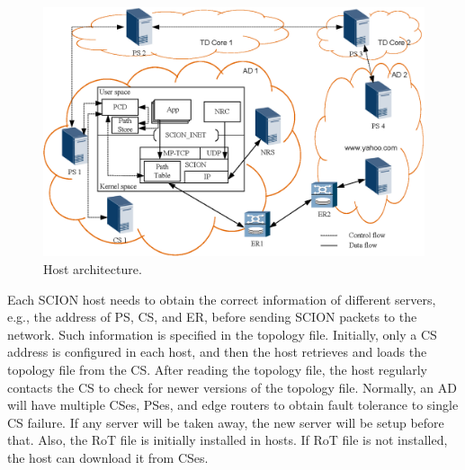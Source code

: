 
\begin{figure}[ht]
\centering
\begin{minipage}{0.85\textwidth}
\includegraphics[width=1\columnwidth]{./fig/host.eps}
\end{minipage}
\caption{Host architecture.}\label{fig:host}
\end{figure}


Each SCION host needs to obtain the correct information of different
servers, e.g., the address of PS, CS, and ER, before sending SCION
packets to the network. Such information is specified in the
topology file. Initially, only a CS address is configured in each
host, and then the host retrieves and loads the topology file from
the CS. After reading the topology file, the host regularly contacts
the CS to check for newer versions of the topology file. Normally,
an AD will have multiple CSes, PSes, and edge routers to obtain
fault tolerance to single CS failure. If any server will be taken
away, the new server will be setup before that.
Also, the RoT file is initially installed in hosts. If
RoT file is not installed, the host can download it from CSes.

